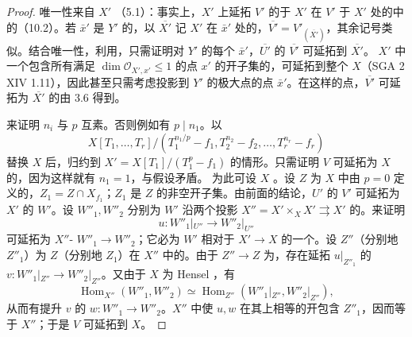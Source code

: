 \begin{proof}
唯一性来自 $X'$ （5.1）：事实上，$X'$ 上延拓 $V'$ 的于 $X'$ 在 $V'$ 于 $X'$ 处的中的（10.2）。若 $\bar x'$ 是 $Y'$ 的，以 $\overline{X'}$ 记 $X'$ 在 $\bar x'$ 处的，$\overline{V'}=V'_{(\overline{X'})}$，其余记号类似。结合唯一性，利用，只需证明对 $Y'$ 的每个 $\bar x'$，$\overline{U'}$ 的 $\overline{V'}$ 可延拓到 $\overline{X'}$。 $X'$ 中一个包含所有满足 $\dim\mathcal O_{X',x'}\leq1$ 的点 $x'$ 的开子集的，可延拓到整个 $X$（SGA 2 XIV 1.11），因此甚至只需考虑投影到 $Y'$ 的极大点的点 $\bar x'$。在这样的点，$\overline{V'}$ 可延拓为 $\overline{X'}$ 的由 3.6 得到。

来证明 $n_i$ 与 $p$ 互素。否则例如有 $p\mid n_1$。以
\[X[T_1,\ldots,T_r]/(T_1^{n_1/p}-f_1,T_2^{n_2}-f_2,\ldots,T_r^{n_r}-f_r)\]
替换 $X$ 后，归约到 $X'=X[T_1]/(T_1^p-f_1)$ 的情形。只需证明 $V$ 可延拓为 $X$ 的，因为这样就有 $n_1=1$，与假设矛盾。
为此可设 $X$ 。设 $Z$ 为 $X$ 中由 $p=0$ 定义的，$Z_1=Z\cap X_{f_1}$；$Z_1$ 是 $Z$ 的非空开子集。由前面的结论，$U'$ 的 $V'$ 可延拓为 $X'$ 的 $W'$。设 $W''_1,W''_2$ 分别为 $W'$ 沿两个投影 $X''=X'\times_X X'\rightrightarrows X'$ 的。来证明
\[u:W''_1|_{U''}\longrightarrow W''_2|_{U''}\]
可延拓为 $X''$- $W''_1\to W''_2$；它必为 $W'$ 相对于 $X'\to X$ 的一个。设 $Z''$（分别地 $Z''_1$）为 $Z$（分别地 $Z_1$）在 $X''$ 中的。由于 $Z''\to Z$ 为，存在延拓 $u|_{Z''_1}$ 的 $v:W''_1|_{Z''}\to W''_2|_{Z''}$。又由于 $X$ 为 Hensel ，有
\[\operatorname{Hom}_{X''}(W''_1,W''_2)\simeq\operatorname{Hom}_{Z''}(W''_1|_{Z''},W''_2|_{Z''}),\]
从而有提升 $v$ 的 $w:W''_1\to W''_2$。$X''$ 中使 $u,w$ 在其上相等的开包含 $Z''_1$，因而等于 $X''$；于是 $V$ 可延拓到 $X$。
\end{proof}

